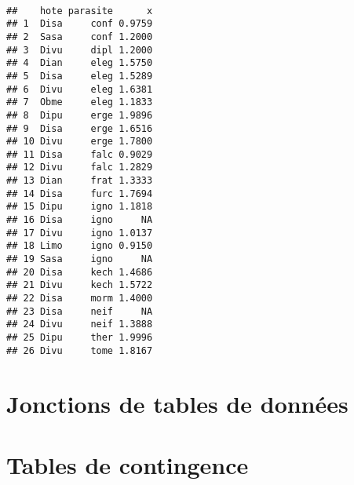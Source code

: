 \begin{knitrout}
\color{fgcolor}\begin{kframe}
\begin{flushleft}
\ttfamily\noindent
{}\hlkeyword{(}\hlkeyword{\usebox{\hlnormalsizeboxdollar}}\hlkeyword{,}{\ }\hlargument{=}{\ }\hlkeyword{(}\hlargument{=}{\ }\hlkeyword{\usebox{\hlnormalsizeboxdollar}}\hlkeyword{,}{\ }\hlargument{=}{\ }\hlkeyword{\usebox{\hlnormalsizeboxdollar}}\hlkeyword{)}\hlkeyword{,}\hspace*{\fill}\\
\hlstd{}{\ }{\ }{\ }{\ }\hlkeyword{)}\mbox{}
\normalfont
\end{flushleft}
\begin{verbatim}
##    hote parasite      x
## 1  Disa     conf 0.9759
## 2  Sasa     conf 1.2000
## 3  Divu     dipl 1.2000
## 4  Dian     eleg 1.5750
## 5  Disa     eleg 1.5289
## 6  Divu     eleg 1.6381
## 7  Obme     eleg 1.1833
## 8  Dipu     erge 1.9896
## 9  Disa     erge 1.6516
## 10 Divu     erge 1.7800
## 11 Disa     falc 0.9029
## 12 Divu     falc 1.2829
## 13 Dian     frat 1.3333
## 14 Disa     furc 1.7694
## 15 Dipu     igno 1.1818
## 16 Disa     igno     NA
## 17 Divu     igno 1.0137
## 18 Limo     igno 0.9150
## 19 Sasa     igno     NA
## 20 Disa     kech 1.4686
## 21 Divu     kech 1.5722
## 22 Disa     morm 1.4000
## 23 Disa     neif     NA
## 24 Divu     neif 1.3888
## 25 Dipu     ther 1.9996
## 26 Divu     tome 1.8167
\end{verbatim}
\end{kframe}
\end{knitrout}


\section{Jonctions de tables de données}

\section{Tables de contingence}
